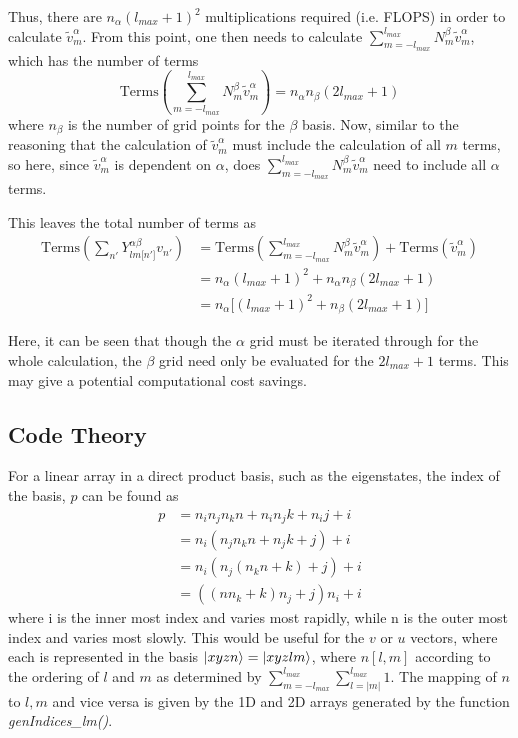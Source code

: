 \documentclass{revtex4-1}
\begin{document}
Thus, there are $n_{\alpha}\left(l_{max}+1\right)^{2}$ multiplications required (i.e. FLOPS) in order to calculate $\tilde{v}_{m}^{\alpha}$. From this point, one then needs to calculate $\sum_{m=-l_{max}}^{l_{max}}N_{m}^{\beta}\tilde{v}_{m}^{\alpha}$, which has the number of terms
\begin{equation}\label{E:GaussQuadLinRotPotPartSumOutSum}
\mbox{Terms}\!\left(\sum_{m=-l_{max}}^{l_{max}}N_{m}^{\beta}\tilde{v}_{m}^{\alpha}\right) = n_{\alpha}n_{\beta}\left(2l_{max}+1\right)
\end{equation}
where $n_{\beta}$ is the number of grid points for the $\beta$ basis. Now, similar to the reasoning that the calculation of $\tilde{v}_{m}^{\alpha}$ must include the calculation of all $m$ terms, so here, since $\tilde{v}_{m}^{\alpha}$ is dependent on $\alpha$, does $\sum_{m=-l_{max}}^{l_{max}}N_{m}^{\beta}\tilde{v}_{m}^{\alpha}$ need to include all $\alpha$ terms.

This leaves the total number of terms as
\begin{align}
\mbox{Terms}\!\left(\sum_{n'}Y_{lm\lbrack n'\rbrack}^{\alpha\beta}v_{n'}\right) 	&= \mbox{Terms}\!\left(\sum_{m=-l_{max}}^{l_{max}}N_{m}^{\beta}\tilde{v}_{m}^{\alpha}\right) + \mbox{Terms}\!\left(\tilde{v}_{m}^{\alpha}\right) \\
																				&= n_{\alpha}\left(l_{max}+1\right)^{2} + n_{\alpha}n_{\beta}\left(2l_{max}+1\right)\\
																				&= n_{\alpha}\lbrack\left(l_{max}+1\right)^{2} + n_{\beta}\left(2l_{max}+1\right)\rbrack
\end{align}

Here, it can	be seen that though the $\alpha$ grid must be iterated through for the whole calculation, the $\beta$ grid need only be evaluated for the $2l_{max}+1$ terms. This may give a potential computational cost savings.

\subsection{Code Theory}\label{S:CodeTheory}
For a linear array in a direct product basis, such as the eigenstates, the index of the basis, $p$ can be found as
\begin{align}
p &= n_{i}n_{j}n_{k}n + n_{i}n_{j}k + n_{i}j + i\\
  &= n_{i}(n_{j}n_{k}n + n_{j}k + j) + i\\
  &= n_{i}(n_{j}(n_{k}n + k) + j) + i\\
  &= ((nn_{k}+k)n_{j} + j)n_{i} + i
\end{align}
where i is the inner most index and varies most rapidly, while n is the outer most index and varies most slowly. This would be useful for the $v$ or $u$ vectors, where each is represented in the basis $\ket{xyzn} = \ket{xyzlm}$, where $n[l,m]$ according to the ordering of $l$ and $m$ as determined by $\sum_{m=-l_{max}}^{l_{max}}\sum_{l=|m|}^{l_{max}}1$. The mapping of $n$ to $l,m$ and vice versa is given by the 1D and 2D arrays generated by the function {\em genIndices\_lm()}.
													
\end{document}
